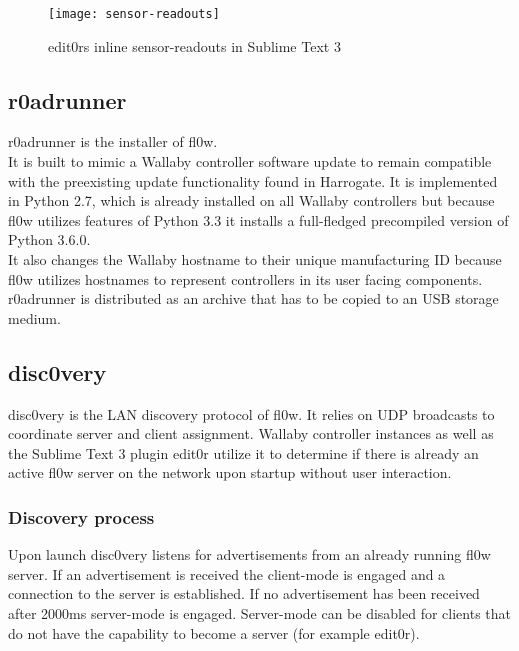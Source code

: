 \documentclass[conference]{IEEEtran}
\begin{document}
\begin{figure}[H]
\centering
\texttt{[image: sensor-readouts]}
\caption{edit0rs\cite{edit0r:Philip Trauner} inline sensor-readouts in Sublime Text 3\cite{Sublime Text 3:Sublime HQ}}
\label{fig:inline_sensor_readouts}
\end{figure}


\subsection{r0adrunner}
r0adrunner is the installer of fl0w\cite{fl0w:Philip Trauner}. \\It is built to mimic a Wallaby\cite{Wallaby Controller:KIPR} controller software update to remain compatible with the preexisting update functionality found in Harrogate\cite{Harrogate:KIPR}. It is implemented in Python\cite{Python:Python Foundation} 2.7, which is already installed on all Wallaby\cite{Wallaby Controller:KIPR} controllers but because fl0w\cite{fl0w:Philip Trauner} utilizes features of Python\cite{Python:Python Foundation} 3.3 it installs a full-fledged precompiled version of Python\cite{Python:Python Foundation} 3.6.0. \\It also changes the Wallaby\cite{Wallaby Controller:KIPR} hostname to their unique manufacturing ID because fl0w\cite{fl0w:Philip Trauner} utilizes hostnames to represent controllers in its user facing components. r0adrunner is distributed as an archive that has to be copied to an USB storage medium.

\subsection{disc0very}
disc0very\cite{disc0very:Christoph Heiss} is the LAN discovery protocol of fl0w\cite{fl0w:Philip Trauner}. It relies on UDP\cite{UDP:J. Postel} broadcasts to coordinate server and client assignment. Wallaby controller instances as well as the Sublime Text 3\cite{Sublime Text 3:Sublime HQ} plugin edit0r\cite{edit0r:Philip Trauner} utilize it to determine if there is already an active fl0w server on the network upon startup without user interaction.


\subsubsection{Discovery process}
Upon launch disc0very\cite{disc0very:Christoph Heiss} listens for advertisements from an already running fl0w\cite{fl0w:Philip Trauner} server. If an advertisement is received the client-mode is engaged and a connection to the server is established. If no advertisement has been received after 2000ms server-mode is engaged. Server-mode can be disabled for clients that do not have the capability to become a server (for example edit0r\cite{edit0r:Philip Trauner}).
\end{document}
